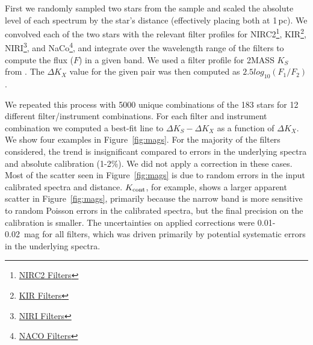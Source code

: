 \documentclass[twocolumn]{aastex62}
\begin{document}
First we randomly sampled two stars from the sample and scaled the absolute level of each spectrum by the star's distance (effectively placing both at 1\,pc). We convolved each of the two stars with the relevant filter profiles for NIRC2\footnote{\href{https://www2.keck.hawaii.edu/inst/nirc2/filters.html}{NIRC2 Filters}}, KIR\footnote{\href{http://www.cfht.hawaii.edu/Instruments/Filters/kir.html}{KIR Filters}}, NIRI\footnote{\href{http://www.gemini.edu/sciops/instruments/niri/imaging/filters}{NIRI Filters}}, and NaCo\footnote{\href{http://www.eso.org/sci/facilities/paranal/instruments/naco/inst/filters.html}{NACO Filters}}, and integrate over the wavelength range of the filters to compute the flux ($F$) in a given band. We used a filter profile for 2MASS $K_S$ from \citet{2003AJ....126.1090C}. The $\Delta K_X$ value for the given pair was then computed as $2.5log_{10}(F_1/F_2)$. 

We repeated this process with 5000 unique combinations of the 183 stars for 12 different filter/instrument combinations. For each filter and instrument combination we computed a best-fit line to $\Delta K_S -\Delta K_X$ as a function of $\Delta K_X$. We show four examples in Figure~\ref{fig:mags}. For the majority of the filters considered, the trend is insignificant compared to errors in the underlying spectra and absolute calibration (1-2\%). We did not apply a correction in these cases. Most of the scatter seen in Figure~\ref{fig:mags} is due to random errors in the input calibrated spectra and distance. $K_{\rm{cont}}$, for example, shows a larger apparent scatter in Figure~\ref{fig:mags}, primarily because the narrow band is more sensitive to random Poisson errors in the calibrated spectra, but the final precision on the calibration is smaller. The uncertainties on applied corrections were 0.01-0.02~mag for all filters, which was driven primarily by potential systematic errors in the underlying spectra. 
\end{document}
